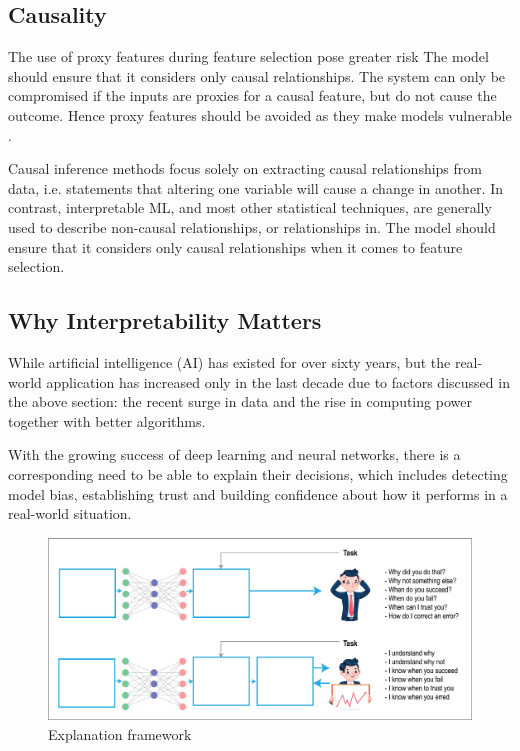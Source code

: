 \subsection*{Causality}

The use of proxy features during feature selection pose greater risk 
The model should ensure that it considers only causal relationships.  The system can only be compromised if the inputs are proxies for a causal feature, but do not cause the outcome. Hence proxy features should be avoided as they make models vulnerable \cite{molnar}.

Causal inference methods focus solely on extracting causal relationships from data, i.e. statements that altering one variable will cause a change in another. In contrast, interpretable ML, and most other statistical techniques, are generally used to describe non-causal relationships, or relationships in. The model should ensure that it considers only causal relationships when it comes to feature selection.

\subsection{Why Interpretability Matters}

While artificial intelligence (AI) has existed for over sixty years, but the real-world application has increased only in the last decade due to factors discussed in the above section: the recent surge in data and the rise in computing power together with better algorithms.

With the growing success of deep learning and neural networks, there is a corresponding need to be able to explain their decisions, which includes detecting model bias, establishing trust and building confidence about how it performs in a real-world situation.

\begin{figure}[htbp]
\centering
\includegraphics[width=1\textwidth]{images/XAI-concept.eps}
\caption{Explanation framework}
\label{fig:Explanation framework}
\end{figure}

